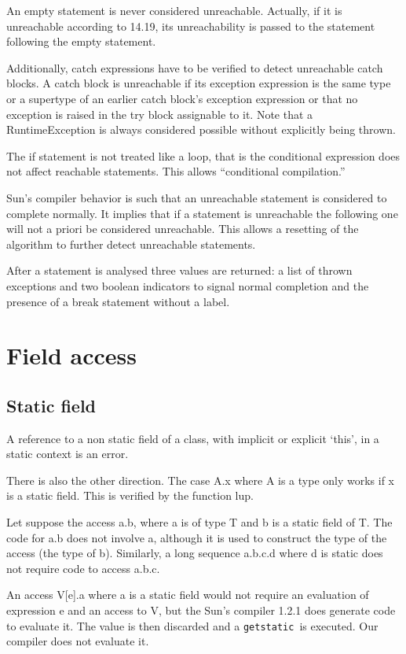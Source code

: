 \documentclass{book}
\newcommand{\jinst}[1]{\verb+#1+}
\begin{document}
An empty statement is never considered unreachable. Actually, if it is 
unreachable according to 14.19, its unreachability is passed to the
statement following the empty statement.

Additionally, catch expressions have to be verified to detect
unreachable catch blocks. A catch block is unreachable if its exception
expression is the same type or a supertype of an earlier catch block's
exception expression or that no exception is raised in the try block
assignable to it. Note that a RuntimeException is always considered
possible without explicitly being thrown.

The if statement is not treated like a loop, that is the conditional
expression does not affect reachable statements. This allows
``conditional compilation.''

Sun's compiler behavior is such that an unreachable statement is
considered to complete normally. It implies that if a statement is
unreachable the following one will not a priori be considered
unreachable. This allows a resetting of the algorithm to further
detect unreachable statements.

After a statement is analysed three values are returned: a list of
thrown exceptions and two boolean indicators to signal normal
completion and the presence of a break statement without a label.

\section{Field access}

\subsection{Static field}

A reference to a non static field of a class, with implicit or
explicit `this', in a static context is an error.

There is also the other direction. The case A.x where A is a type only
works if x is a static field.  This is verified by the function lup.

Let suppose the access a.b, where a is of type T and b is a static
field of T. The code for a.b does not involve a, although it is used
to construct the type of the access (the type of b). Similarly, a
long sequence a.b.c.d where d is static does not require code to
access a.b.c.

An access V[e].a where a is a static field would not require an
evaluation of expression e and an access to V, but the Sun's compiler
1.2.1 does generate code to evaluate it. The value is then discarded
and a \jinst{getstatic}\ is executed. Our compiler does not evaluate
it.
\end{document}
